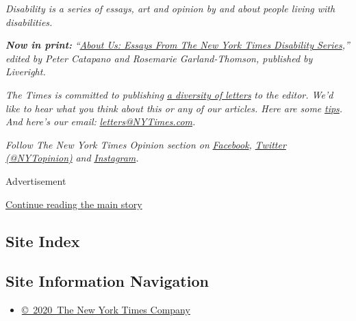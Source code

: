 \emph{Disability is a series of essays, art and opinion by and about
people living with disabilities.}

\emph{\textbf{Now in print:}}
\emph{``}\href{http://bit.ly/2WTWIVv}{\emph{About Us: Essays From The
New York Times Disability Series}}\emph{,'' edited by Peter Catapano and
Rosemarie Garland-Thomson, published by Liveright.}

\emph{The Times is committed to publishing}
\href{https://www.nytimes3xbfgragh.onion/2019/01/31/opinion/letters/letters-to-editor-new-york-times-women.html}{\emph{a
diversity of letters}} \emph{to the editor. We'd like to hear what you
think about this or any of our articles. Here are some}
\href{https://help.nytimes3xbfgragh.onion/hc/en-us/articles/115014925288-How-to-submit-a-letter-to-the-editor}{\emph{tips}}\emph{.
And here's our email:}
\href{mailto:letters@NYTimes.com}{\emph{letters@NYTimes.com}}\emph{.}

\emph{Follow The New York Times Opinion section on}
\href{https://www.facebookcorewwwi.onion/nytopinion}{\emph{Facebook}}\emph{,}
\href{http://twitter.com/NYTOpinion}{\emph{Twitter (@NYTopinion)}}
\emph{and}
\href{https://www.instagram.com/nytopinion/}{\emph{Instagram}}\emph{.}

Advertisement

\protect\hyperlink{after-bottom}{Continue reading the main story}

\hypertarget{site-index}{%
\subsection{Site Index}\label{site-index}}

\hypertarget{site-information-navigation}{%
\subsection{Site Information
Navigation}\label{site-information-navigation}}

\begin{itemize}
\tightlist
\item
  \href{https://help.nytimes3xbfgragh.onion/hc/en-us/articles/115014792127-Copyright-notice}{©~2020~The
  New York Times Company}
\end{itemize}

